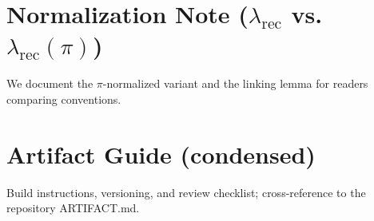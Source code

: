 \documentclass[11pt]{article}
\begin{document}
\section{Normalization Note (\texorpdfstring{$\lambda_{\mathrm{rec}}$}{lambda} vs. $\lambda_{\mathrm{rec}}(\pi)$)}\label{app:norm}
We document the $\pi$-normalized variant and the linking lemma for readers comparing conventions.

\section{Artifact Guide (condensed)}\label{app:artifact}
Build instructions, versioning, and review checklist; cross-reference to the repository ARTIFACT.md.
\end{document}
